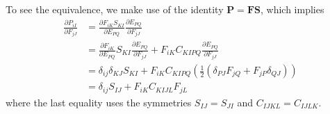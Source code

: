 \documentclass[a4paper]{article}
\newcommand{\mb}[1]{{\mathbf{#1}}}
\newcommand{\FF}{\mb{F}}
\newcommand{\PP}{\mb{P}}
\renewcommand{\SS}{\mb{S}}
\begin{document}
    To see the equivalence, we make use of the identity $\PP = \FF \SS$,
    which implies
    \begin{align}
        \frac{\partial P_{iI}}{\partial F_{jJ}} &= \frac{\partial
            F_{iK}S_{KI}}{\partial E_{PQ}} \frac{\partial E_{PQ}}{\partial
            F_{jJ}} \\
        &= \frac{\partial F_{iK}}{\partial E_{PQ}} S_{KI} \frac{\partial
            E_{PQ}}{\partial F_{jJ}} + F_{iK}C_{KIPQ} \frac{\partial
            E_{PQ}}{\partial F_{jJ}} \\
        &= \delta_{ij} \delta_{KJ} S_{KI}  + F_{iK}C_{KIPQ}\left
        (\frac{1}{2}\left(\delta_{PJ}F_{jQ} + F_{jP}\delta_{QJ}\right)\right) \\
        &= \delta_{ij}S_{IJ} + F_{iK}C_{KIJL}F_{jL} \label{eq:stress-derivative}
    \end{align}
    where the last equality uses the symmetries $S_{IJ} = S_{JI}$ and
    $C_{IJKL} = C_{IJLK}$.
\end{document}
